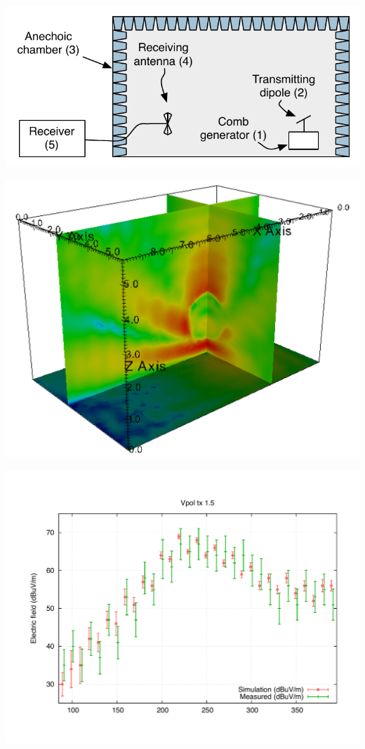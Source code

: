 \documentclass[portrait,fontscale=0.35,paperwidth=800mm, paperheight=1200mm]{baposter}
\begin{document}
\begin{poster}
{    \begin{center}
        \begin{minipage}{0.32\textwidth}
            \includegraphics[width=\textwidth]{img/setup}
        \end{minipage}
        \begin{minipage}{0.32\textwidth}
            \includegraphics[width=\textwidth]{img/ant230}
        \end{minipage}
        \begin{minipage}{0.32\textwidth}
            \includegraphics[width=\textwidth]{img/comparison150v}%

\end{minipage}
\end{center}}
\end{poster}
\end{document}
